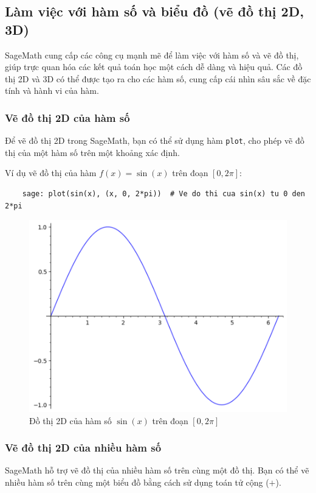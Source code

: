 \subsection{Làm việc với hàm số và biểu đồ (vẽ đồ thị 2D, 3D)}

SageMath cung cấp các công cụ mạnh mẽ để làm việc với hàm số và vẽ đồ thị, giúp trực quan hóa các kết quả toán học một cách dễ dàng và hiệu quả. Các đồ thị 2D và 3D có thể được tạo ra cho các hàm số, cung cấp cái nhìn sâu sắc về đặc tính và hành vi của hàm.

\subsubsection{Vẽ đồ thị 2D của hàm số}

Để vẽ đồ thị 2D trong SageMath, bạn có thể sử dụng hàm \texttt{plot}, cho phép vẽ đồ thị của một hàm số trên một khoảng xác định. 

Ví dụ vẽ đồ thị của hàm \( f(x) = \sin(x) \) trên đoạn \( [0, 2\pi] \):

\begin{lstlisting}
	sage: plot(sin(x), (x, 0, 2*pi))  # Ve do thi cua sin(x) tu 0 den 2*pi
\end{lstlisting}
\begin{figure}
	\centering
	\includegraphics[width=0.7\linewidth]{images/screenshot008}
	\caption{Đồ thị 2D của hàm số \(\sin(x)\) trên đoạn \( [0, 2\pi] \)}
	\label{fig:screenshot008}
\end{figure}

\subsubsection{Vẽ đồ thị 2D của nhiều hàm số}

SageMath hỗ trợ vẽ đồ thị của nhiều hàm số trên cùng một đồ thị. Bạn có thể vẽ nhiều hàm số trên cùng một biểu đồ bằng cách sử dụng toán tử cộng (\(+\)).

